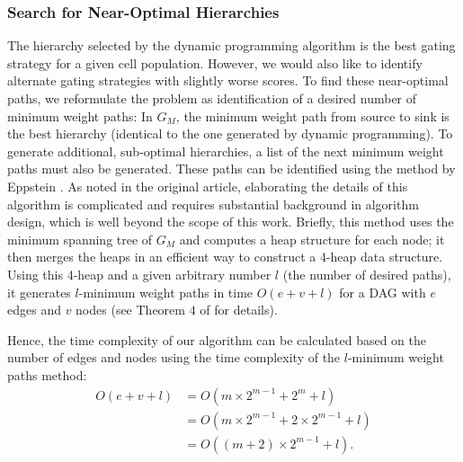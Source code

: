 \subsubsection{Search for Near-Optimal Hierarchies}
The hierarchy selected by the dynamic programming algorithm is the best gating strategy for a given cell population.
However, we would also like to identify alternate gating strategies with slightly worse scores.  
To find these near-optimal paths, we reformulate the problem as identification of a desired number of minimum weight paths: %
In $G_M$, the minimum weight path from source to sink is the best hierarchy (identical to the one generated by dynamic programming).  
To generate additional, sub-optimal hierarchies, a list of the next minimum weight paths must also be generated. 
These paths can be identified using the method by Eppstein  \cite{eppstein1998finding}.  
As noted in the original article, elaborating the details of this algorithm is complicated and requires substantial
background in algorithm design, which is well beyond the scope of this work.  Briefly, this method uses the minimum
spanning tree of $G_M$ and computes a heap structure for each node; it then merges the heaps in an efficient way to
construct a 4-heap data structure. Using this 4-heap and a given arbitrary number $l$ (the number of desired paths), it generates $l$-minimum weight paths in time $O(e + v + l)$ for a DAG with $e$ edges and $v$ nodes (see Theorem $4$ of \cite{eppstein1998finding} for details).


Hence, the time complexity of our algorithm can be calculated based on the number of
edges and nodes using the time complexity of the $l$-minimum weight paths method:
\begin{equation}
  \begin{split}
    O(e + v + l) & = O(m \times 2^{m-1} + 2^{m} + l)\\
    & = O(m \times 2^{m-1} + 2 \times 2^{m-1} + l)\\
    & = O((m+2) \times 2^{m-1} + l).\\
  \end{split}
  \label{order_equation}
\end{equation}

